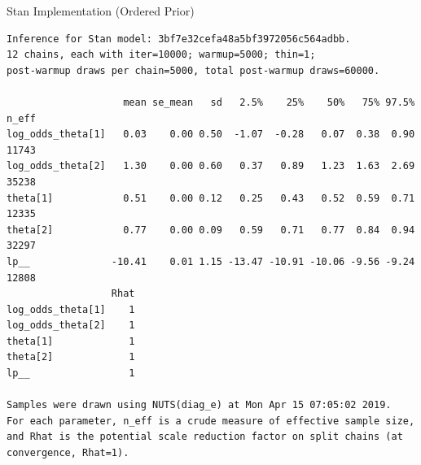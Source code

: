 \documentclass[dvipdfmx,bigger,aspectratio=169]{beamer}
\begin{document}
\begin{frame}[fragile,allowframebreaks,label=,t]{Stan Implementation (Ordered Prior)}
\normalsize
\scriptsize
\normalsize
\scriptsize
\begin{verbatim}
Inference for Stan model: 3bf7e32cefa48a5bf3972056c564adbb.
12 chains, each with iter=10000; warmup=5000; thin=1; 
post-warmup draws per chain=5000, total post-warmup draws=60000.

                    mean se_mean   sd   2.5%    25%    50%   75% 97.5% n_eff
log_odds_theta[1]   0.03    0.00 0.50  -1.07  -0.28   0.07  0.38  0.90 11743
log_odds_theta[2]   1.30    0.00 0.60   0.37   0.89   1.23  1.63  2.69 35238
theta[1]            0.51    0.00 0.12   0.25   0.43   0.52  0.59  0.71 12335
theta[2]            0.77    0.00 0.09   0.59   0.71   0.77  0.84  0.94 32297
lp__              -10.41    0.01 1.15 -13.47 -10.91 -10.06 -9.56 -9.24 12808
                  Rhat
log_odds_theta[1]    1
log_odds_theta[2]    1
theta[1]             1
theta[2]             1
lp__                 1

Samples were drawn using NUTS(diag_e) at Mon Apr 15 07:05:02 2019.
For each parameter, n_eff is a crude measure of effective sample size,
and Rhat is the potential scale reduction factor on split chains (at 
convergence, Rhat=1).
\end{verbatim}

\normalsize
\end{frame}
\end{document}
